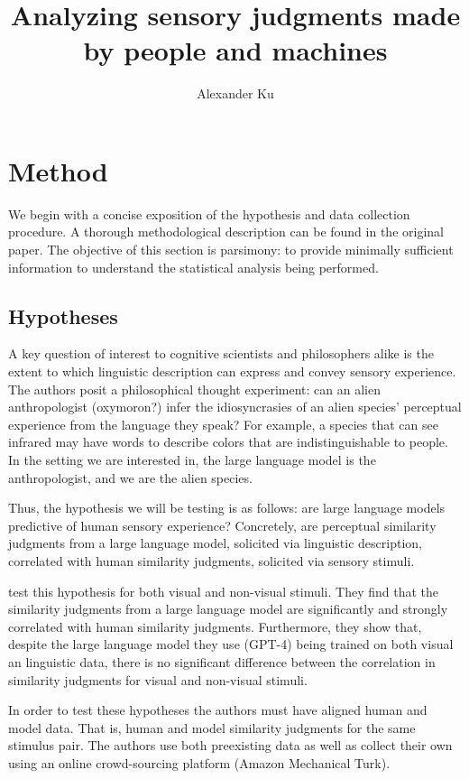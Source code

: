 \documentclass[man]{apa7}
\title{Analyzing sensory judgments made by people and machines}
\author{Alexander Ku}
\affiliation{Department of Psychology, Princeton University}
\begin{document}
\maketitle

\section{Method}

We begin with a concise exposition of the hypothesis and data collection procedure. A thorough methodological description can be found in the original paper. The objective of this section is parsimony: to provide minimally sufficient information to understand the statistical analysis being performed.

\subsection{Hypotheses}

A key question of interest to cognitive scientists and philosophers alike is the extent to which linguistic description can express and convey sensory experience. The authors posit a philosophical thought experiment: can an alien anthropologist (oxymoron?) infer the idiosyncrasies of an alien species' perceptual experience from the language they speak? For example, a species that can see infrared may have words to describe colors that are indistinguishable to people. In the setting we are interested in, the large language model is the anthropologist, and we are the alien species.

Thus, the hypothesis we will be testing is as follows: are large language models predictive of human sensory experience? Concretely, are perceptual similarity judgments from a large language model, solicited via linguistic description, correlated with human similarity judgments, solicited via sensory stimuli.

\cite{marjieh2023language} test this hypothesis for both visual and non-visual stimuli. They find that the similarity judgments from a large language model are significantly and strongly correlated with human similarity judgments. Furthermore, they show that, despite the large language model they use (GPT-4) being trained on both visual an linguistic data, there is no significant difference between the correlation in similarity judgments for visual and non-visual stimuli.

In order to test these hypotheses the authors must have aligned human and model data. That is, human and model similarity judgments for the same stimulus pair. The authors use both preexisting data as well as collect their own using an online crowd-sourcing platform (Amazon Mechanical Turk).
\end{document}
